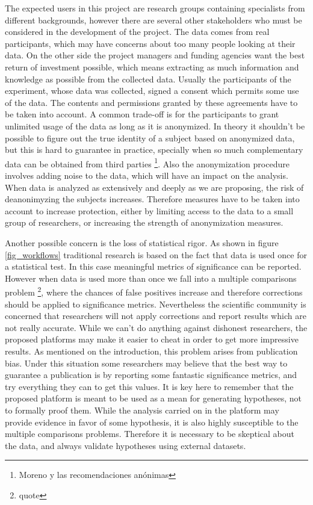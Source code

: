 The expected users in this project are research groups containing specialists from different backgrounds, however there are several other stakeholders who must be considered in the development of the project. The data comes from real participants, which may have concerns about too many people looking at their data. On the other side the project managers and funding agencies want the best return of investment possible, which means extracting as much information and knowledge as possible from the collected data. Usually the participants of the experiment, whose data was collected, signed a consent which permits some use of the data. The contents and permissions granted by these agreements have to be taken into account. A common trade-off is for the participants to grant unlimited usage of the data as long as it is anonymized. In theory it shouldn't be possible to figure out the true identity of a subject based on anonymized data, but this is hard to guarantee in practice, specially when so much complementary data can be obtained from third parties \footnote{Moreno y las recomendaciones anónimas}. Also the anonymization procedure involves adding noise to the data, which will have an impact on the analysis. When data is analyzed as extensively and deeply as we are proposing, the risk of deanonimyzing the subjects increases. Therefore measures have to be taken into account to increase protection, either by limiting access to the data to a small group of researchers, or increasing the strength of anonymization measures. 

Another possible concern is the loss of statistical rigor. As shown in figure \ref{fig_workflows} traditional research is based on the fact that data is used once for a statistical test. In this case meaningful metrics of significance can be reported. However when data is used more than once we fall into a multiple comparisons problem \footnote{quote}, where the chances of false positives increase and therefore corrections should be applied to significance metrics. Nevertheless the scientific community is concerned that researchers will not apply corrections and report results which are not really accurate. While we can't do anything against dishonest researchers, the proposed platforms may make it easier to cheat in order to get more impressive results. As mentioned on the introduction, this problem arises from publication bias. Under this situation some researchers may believe that the best way to guarantee a publication is by reporting some fantastic significance metrics, and try everything they can to get this values. It is key here to remember that the proposed platform is meant to be used as a mean for generating hypotheses, not to formally proof them. While the analysis carried on in the platform may provide evidence in favor of some hypothesis, it is also highly susceptible to the multiple comparisons problems. Therefore it is necessary to be skeptical about the data, and always validate hypotheses using external datasets.  

